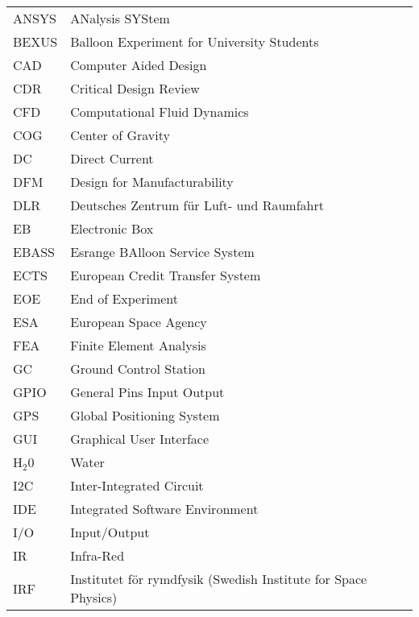 

     \begin{longtable}{p{3cm} p{9cm}}
             ANSYS       & ANalysis SYStem\\
             BEXUS       & Balloon Experiment for University Students\\
             CAD         & Computer Aided Design \\
             CDR         & Critical Design Review\\
             CFD         & Computational Fluid Dynamics\\
             COG         & Center of Gravity \\
             DC          & Direct Current\\
             DFM         & Design for Manufacturability \\
             DLR         & Deutsches Zentrum f{\"u}r Luft- und Raumfahrt \\
             EB          & Electronic Box \\
             EBASS       & Esrange BAlloon Service System\\
             ECTS        & European Credit Transfer System\\
             EOE         & End of Experiment\\
             ESA         & European Space Agency \\
             FEA         & Finite Element Analysis\\
             GC          & Ground Control Station\\
             GPIO        & General Pins Input Output\\
             GPS         & Global Positioning System\\
             GUI         & Graphical User Interface\\
             H$_2$0      & Water \\
             I2C         & Inter-Integrated Circuit \\
             IDE         & Integrated Software Environment \\
             I/O         & Input/Output\\
             IR          & Infra-Red\\
             IRF         & Institutet för rymdfysik (Swedish Institute for Space Physics)\\

\end{longtable}
